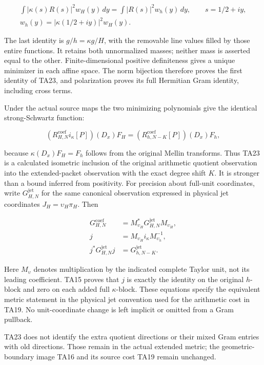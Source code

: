 \[
\begin{gathered}\int|\kappa(s)R(s)|^2w_H(y)\,dy=\int|R(s)|^2w_h(y)\,dy,\qquad s=1/2+iy,\\w_h(y)=|\kappa(1/2+iy)|^2w_H(y).\end{gathered}\tag{TA24}
\]

The last identity is \(g/h=\kappa g/H\), with the removable line values
filled by those entire functions. It retains both unnormalized masses;
neither mass is asserted equal to the other. Finite-dimensional positive
definiteness gives a unique minimizer in each affine space. The norm
bijection therefore proves the first identity of TA23, and polarization
proves its full Hermitian Gram identity, including cross terms.

Under the actual source maps the two minimizing polynomials give the
identical strong-Schwartz function:

\[
(R_{H,N}^{\mathrm{coef}}i_\kappa[P])(D_x)F_H=(R_{h,N-K}^{\mathrm{coef}}[P])(D_x)F_h,
\]

because \(\kappa(D_x)F_H=F_h\) follows from the original Mellin transforms.
Thus TA23 is a calculated isometric inclusion of the original arithmetic
quotient observation into the extended-packet observation with the exact
degree shift \(K\). It is stronger than a bound inferred from positivity.
For precision about full-unit coordinates, write \(G_{H,N}^{\mathrm{jet}}\) for the
same canonical observation expressed in physical jet coordinates
\(J_H=\upsilon_H\pi_H\). Then

\[
\begin{aligned}G_{H,N}^{\mathrm{coef}}&=M_{\upsilon_H}^*G_{H,N}^{\mathrm{jet}}M_{\upsilon_H},\\j&=M_{\upsilon_H}i_\kappa M_{\upsilon_h}^{-1},\\j^*G_{H,N}^{\mathrm{jet}}j&=G_{h,N-K}^{\mathrm{jet}}.\end{aligned}
\]

Here \(M_\upsilon\) denotes multiplication by the indicated complete Taylor
unit, not its leading coefficient. TA15 proves that \(j\) is exactly the
identity on the original \(h\)-block and zero on each added full \(\kappa\)-block.
These equations specify the equivalent metric statement in the physical
jet convention used for the arithmetic cost in TA19. No unit-coordinate
change is left implicit or omitted from a Gram pullback.

TA23 does not identify the extra quotient directions or their mixed Gram
entries with old directions. Those remain in the actual extended metric; the
geometric-boundary image TA16 and its source cost TA19 remain unchanged.


